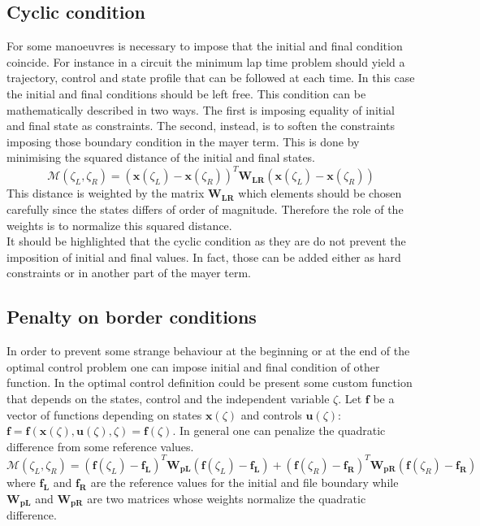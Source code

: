 \subsection{Cyclic condition}
%
For some manoeuvres is necessary to impose that the initial and final condition coincide. For instance in a circuit the minimum lap time problem should yield a trajectory, control and state profile that can be followed at each time. In this case the initial and final conditions should be left free. This condition can be mathematically described in two ways. The first is imposing equality of initial and final state as constraints. The second, instead, is to soften the constraints imposing those boundary condition in the mayer term. This is done by minimising the squared distance of the initial and final states.
%
\begin{equation}
    \mathcal{M}(\zeta_L,\zeta_R) = (\mathbf{x}(\zeta_L)-\mathbf{x}(\zeta_R))^T \mathbf{W_{LR}} (\mathbf{x}(\zeta_L)-\mathbf{x}(\zeta_R)) 
\end{equation}
%
This distance is weighted by the matrix $\mathbf{W_{LR}}$ which elements should be chosen carefully since the states differs of order of magnitude. Therefore the role of the weights is to normalize this squared distance.\\
It should be highlighted that the cyclic condition as they are do not prevent the imposition of initial and final values. In fact, those can be added either as hard constraints or in another part of the mayer term.
%
\subsection{Penalty on border conditions}
%
In order to prevent some strange behaviour at the beginning or at the end of the optimal control problem one can impose initial and final condition of other function. In the optimal control definition could be present some custom function that depends on the states, control and the independent variable $\zeta$. Let $\mathbf{f}$ be a vector of functions depending on states $\mathbf{x}(\zeta)$ and controls $\mathbf{u}(\zeta)$: $\mathbf{f} = \mathbf{f}(\mathbf{x}(\zeta),\mathbf{u}(\zeta),\zeta)=\mathbf{f}(\zeta)$. In general one can penalize the quadratic difference from some reference values.
%
\begin{equation}
    \mathcal{M}(\zeta_L,\zeta_R) = (\mathbf{f}(\zeta_L)-\mathbf{f_L})^T \mathbf{W_{pL}} (\mathbf{f}(\zeta_L)-\mathbf{f_L}) + (\mathbf{f}(\zeta_R)-\mathbf{f_R})^T \mathbf{W_{pR}} (\mathbf{f}(\zeta_R)-\mathbf{f_R})
\end{equation}
%
where $\mathbf{f_L}$ and $\mathbf{f_R}$ are the reference values for the initial and file boundary while $\mathbf{W_{pL}}$ and $\mathbf{W_{pR}}$ are two matrices whose weights normalize the quadratic difference.
%
